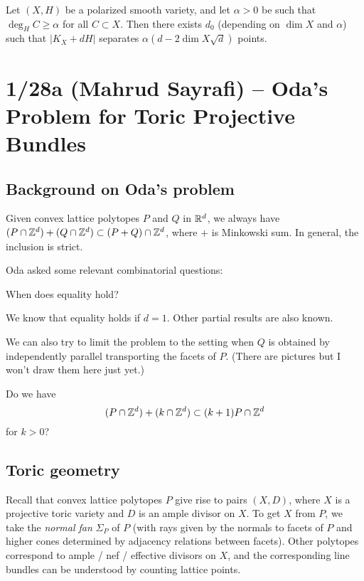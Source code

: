 \documentclass{article}
\begin{document}
\begin{thm}
	Let $(X, H)$ be a polarized smooth variety, and let $\alpha > 0$ be such that $\deg_H C \geq \alpha$ for all $C \subset X$.
	Then there exists $d_0$ (depending on $\dim X$ and $\alpha$) such that $|K_X + dH|$ separates $\alpha (d - 2 \dim X \sqrt{d})$ points.
\end{thm}

\section{1/28a (Mahrud Sayrafi) -- Oda's Problem for Toric Projective Bundles}

\subsection{Background on Oda's problem}

Given convex lattice polytopes $P$ and $Q$ in $\mathbb{R}^d$, we always have $(P \cap \mathbb{Z}^d) + (Q \cap \mathbb{Z}^d) \subset (P + Q) \cap \mathbb{Z}^d$, where $+$ is Minkowski sum.
In general, the inclusion is strict.

Oda asked some relevant combinatorial questions:

\begin{qn}[Oda 1]
	When does equality hold?
\end{qn}

We know that equality holds if $d = 1$.
Other partial results are also known.

We can also try to limit the problem to the setting when $Q$ is obtained by independently parallel transporting the facets of $P$.
(There are pictures but I won't draw them here just yet.)

\begin{qn}[Oda 2]
	Do we have
	\[
		(P \cap \mathbb{Z}^d) + (k \cap \mathbb{Z}^d) \subset (k+1) P \cap \mathbb{Z}^d
	\]
	for $k > 0$?
\end{qn}

\subsection{Toric geometry}

Recall that convex lattice polytopes $P$ give rise to pairs $(X, D)$, where $X$ is a projective toric variety and $D$ is an ample divisor on $X$.
To get $X$ from $P$, we take the \emph{normal fan} $\Sigma_P$ of $P$ (with rays given by the normals to facets of $P$ and higher cones determined by adjacency relations between facets).
Other polytopes correspond to ample / nef / effective divisors on $X$, and the corresponding line bundles can be understood by counting lattice points.
\end{document}
